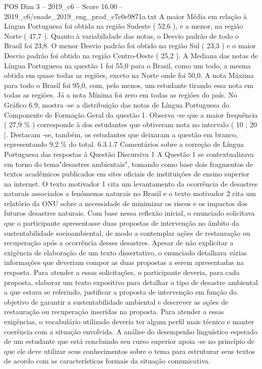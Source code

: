 \begin{textsample}{POS Dim 3 – 2019\_c6 – Score 16.00 – 2019\_c6/enade\_2019\_eng\_prod\_c7c0e9871a.txt}
A maior Média em relação à Língua Portuguesa foi obtida na região Sudeste ( 52,6 ), e a menor, na região Norte ( 47,7 ).
Quanto à variabilidade das notas, o Desvio padrão de todo o Brasil foi 23,8.
O menor Desvio padrão foi obtido na região Sul ( 23,3 ) e o maior Desvio padrão foi obtido na região Centro-Oeste ( 25,2 ).
A Mediana das notas de Língua Portuguesa na questão 1 foi 55,0 para o Brasil, como um todo, a mesma obtida em quase todas as regiões, exceto na Norte onde foi 50,0.
A nota Máxima para todo o Brasil foi 95,0, com, pelo menos, um estudante tirando essa nota em todas as regiões.
Já a nota Mínima foi zero em todas as regiões do país.
No Gráfico 6.9, mostra -se a distribuição das notas de Língua Portuguesa do Componente de Formação Geral da questão 1.
Observa -se que a maior frequência ( 27,9 \% ) corresponde à dos estudantes que obtiveram nota no intervalo ( 10 ; 20 ].
Destacam -se, também, os estudantes que deixaram a questão em branco, representando 9,2 \% do total. 6.3.1.7 Comentários sobre a correção de Língua Portuguesa das respostas à Questão Discursiva 1 A Questão 1 se contextualizava em torno do tema"desastres ambientais", tomando como base dois fragmentos de textos acadêmicos publicados em sites oficiais de instituições de ensino superior na internet.
O texto motivador 1 cita um levantamento da ocorrência de desastres naturais associados a fenômenos naturais no Brasil e o texto motivador 2 cita um relatório da ONU sobre a necessidade de minimizar os riscos e os impactos dos futuros desastres naturais.
Com base nessa reflexão inicial, o enunciado solicitava que o participante apresentasse duas propostas de intervenção no âmbito da sustentabilidade socioambiental, de modo a contemplar ações de restauração ou recuperação após a ocorrência desses desastres.
Apesar de não explicitar a exigência de elaboração de um texto dissertativo, o enunciado detalhava várias informações que deveriam compor as duas propostas a serem apresentadas na resposta.
Para atender a essas solicitações, o participante deveria, para cada proposta, elaborar um texto expositivo para detalhar o tipo de desastre ambiental a que estava se referindo, justificar a proposta de intervenção em função do objetivo de garantir a sustentabilidade ambiental e descrever as ações de restauração ou recuperação inseridas na proposta.
Para atender a essas exigências, o vocabulário utilizado deveria ter algum perfil mais técnico e manter coerência com a situação envolvida.
A análise do desempenho linguístico esperado de um estudante que está concluindo seu curso superior apoia -se no princípio de que ele deve utilizar seus conhecimentos sobre o tema para estruturar seus textos de acordo com as características formais da situação comunicativa.

\end{textsample}
